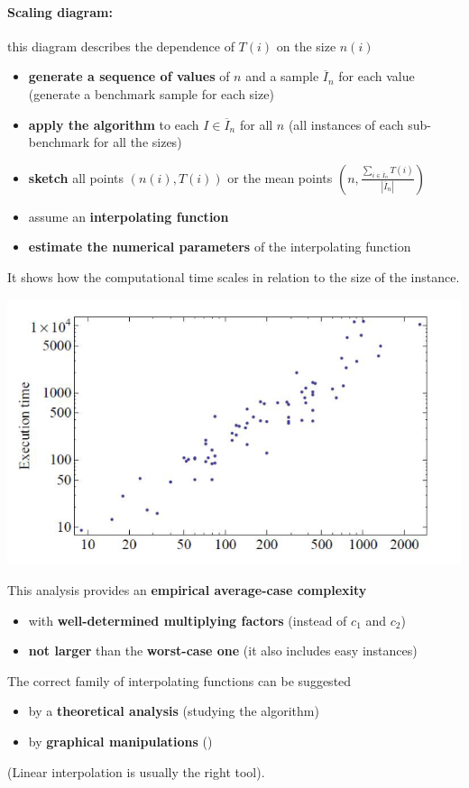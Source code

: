 \documentclass[11pt]{article}
\begin{document}
	\newpage
	
	\paragraph{Scaling diagram:} this diagram describes the dependence of $T (i )$ on the size $n (i )$
	\begin{itemize}
		\item \textbf{generate a sequence of values} of $n$ and a sample $\overline{I}_n$ for each value (generate a benchmark sample for each size)
		\item \textbf{apply the algorithm} to each $I \in \overline{I}_n$ for all $n$ (all instances of each sub-benchmark for all the sizes)
		\item \textbf{sketch} all points $(n (i ) , T (i ))$ or the mean points $\left(n, \frac{\sum_{i \in \overline{I}_n} T(i)}{|\overline{I}_n|}\right)$ 
		\item assume an \textbf{interpolating function}
		\item \textbf{estimate the numerical parameters} of the interpolating function
	\end{itemize}
	It shows how the computational time scales in relation to the size of the instance.
	\begin{center}
		\includegraphics[width=0.7\columnwidth]{img/SD1}
	\end{center}
	This analysis provides an \textbf{empirical average-case complexity}
	\begin{itemize}
		\item with \textbf{well-determined multiplying factors} (instead of $c_1$ and $c_2$)
		\item \textbf{not larger} than the \textbf{worst-case one} (it also includes easy instances)
	\end{itemize}
	
	\newpage
	
	The correct family of interpolating functions can be suggested
	\begin{itemize}
		\item by a \textbf{theoretical analysis} (studying the algorithm)
		\item by \textbf{graphical manipulations} ()
	\end{itemize}
	(Linear interpolation is usually the right tool).\\
	
\end{document}
